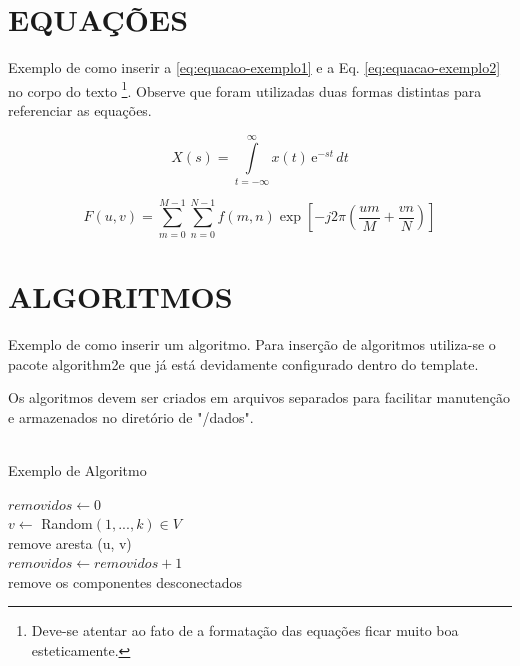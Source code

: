 \chapter{EQUAÇÕES}
\label{chap:equacoes}

Exemplo de como inserir a \autoref{eq:equacao-exemplo1} e a Eq. \ref{eq:equacao-exemplo2} no corpo do texto \footnote{Deve-se atentar ao fato de a formatação das equações ficar muito boa esteticamente.}. Observe que foram utilizadas duas formas distintas para referenciar as equações.

\begin{equation}
    X(s) = \int\limits_{t = -\infty}^{\infty} x(t) \, \text{e}^{-st} \, dt
    \label{eq:equacao-exemplo1}
\end{equation}

\begin{equation}
    F(u, v) = \sum_{m = 0}^{M - 1} \sum_{n = 0}^{N - 1} f(m, n) \exp \left[ -j 2 \pi \left( \frac{u m}{M} + \frac{v n}{N} \right) \right]
    \label{eq:equacao-exemplo2}
\end{equation}

\chapter{ALGORITMOS}
\label{chap:algoritmos}

Exemplo de como inserir um algoritmo. Para inserção de algoritmos utiliza-se o pacote {\ttfamily algorithm2e} que já está devidamente configurado dentro do template.

Os algoritmos devem ser criados em arquivos separados para facilitar manutenção e armazenados no diretório de "/dados".\\
\\

\begin{algorithm}
    \caption{Exemplo de Algoritmo}
    $removidos \leftarrow 0$ \\
     {
        $v \leftarrow$ Random$(1, ..., k) \in V$ \\
             {
                remove aresta (u, v)\\
                $removidos \leftarrow removidos + 1$\\
            }
             {
                remove os componentes desconectados\\
            }
        }
\end{algorithm}


